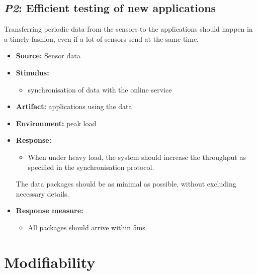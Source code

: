 \documentclass[english]{sareport}
\begin{document}
\subsection{\emph{P2}: Efficient testing of new applications}
Transferring periodic data from the sensors to the applications should happen in a timely fashion, even if a lot of sensors send at the same time.

\begin{itemize}
    \item \textbf{Source:} Sensor data
    \item \textbf{Stimulus:}
        \begin{itemize}
            \item synchronisation of data with the online service
        \end{itemize}

    \item \textbf{Artifact:} applications using the data
    \item \textbf{Environment:} peak load
    \item \textbf{Response:}
        \begin{itemize}
            \item When under heavy load, the system should increase the throughput as specified in the synchronisation protocol.
        \end{itemize} The data packages should be as minimal as possible, without excluding necessary details.
    \item \textbf{Response measure:}
        \begin{itemize}
            \item All packages should arrive within 5ms.
        \end{itemize}
\end{itemize}

\section{Modifiability}
\end{document}

